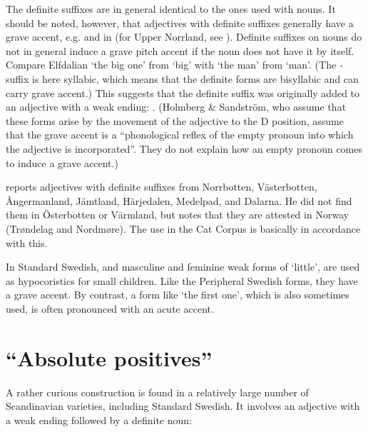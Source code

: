 The definite suffixes are in general identical to the ones used with nouns. It should be noted, however, that adjectives with definite suffixes generally have a grave accent, e.g.  and  in  (for Upper Norrland, see \citet{HolmbergEtAl}). Definite suffixes on nouns do not in general induce a grave pitch accent if the noun does not have it by itself. Compare Elfdalian  ‘the big one’ from  ‘big’ with  ‘the man’ from  ‘man’. (The\textit{ {}-} suffix is here syllabic, which means that the definite forms are bisyllabic and can carry grave accent.) This suggests that the definite suffix was originally added to an adjective with a weak ending: . (Holmberg \& Sandström, who assume that these forms arise by the movement of the adjective to the D position, assume that the grave accent is a “phonological reflex of the empty pronoun into which the adjective is incorporated”. They do not explain how an empty pronoun comes to induce a grave accent.) 

\citet[51]{Delsing2003a} reports adjectives with definite suffixes from Norrbotten, Västerbotten, Ångermanland, Jämtland, Härjedalen, Medelpad, and Dalarna. He did not find them in Österbotten or Värmland, but notes that they are attested in Norway (Trøndelag and Nordmøre). The use in the Cat Corpus is basically in accordance with this. 

In Standard Swedish,  and  masculine and feminine weak forms of  ‘little’, are used as hypocoristics for small children. Like the Peripheral Swedish forms, they have a grave accent. By contrast, a form like  ‘the first one’, which is also sometimes used, is often pronounced with an acute accent. 

\section{“Absolute positives”}
\label{bkm:Ref141250984}

A rather curious construction is found in a relatively large number of Scandinavian varieties, including Standard Swedish. It involves an adjective with a weak ending followed by a definite noun:

